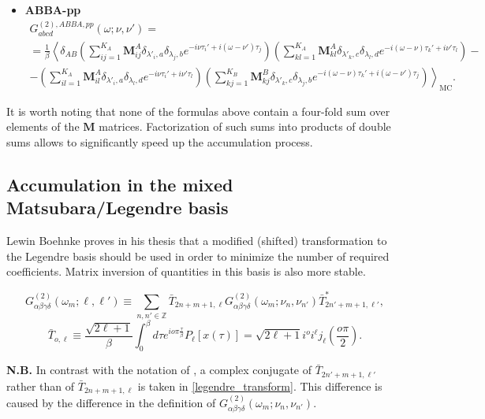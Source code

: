 \documentclass[a4paper,12pt]{article}
\renewcommand{\t}{\ensuremath{\tau}}
\newcommand{\w}{\ensuremath{\omega}}
\begin{document}
\begin{itemize}
	\item \textbf{ABBA-pp}
	\begin{multline}
	G^{(2),ABBA,pp}_{abcd}(\w;\nu,\nu') =\\= \frac{1}{\beta}\left\langle
		\delta_{AB}
		\left(\sum_{ij=1}^{K_A} \mathbf{M}^A_{ij}
			\delta_{\lambda'_i,a} \delta_{\lambda_j,b}
			e^{-i\nu\t_i'+i(\w-\nu')\t_j}
		\right)
		\left(\sum_{kl=1}^{K_A} \mathbf{M}^A_{kl}
			\delta_{\lambda'_k,c} \delta_{\lambda_l,d}
			e^{-i(\w-\nu)\t_k'+i\nu'\t_l}
		\right) -\right.\\\left.-
		\left(\sum_{il=1}^{K_A} \mathbf{M}^A_{il}
			\delta_{\lambda'_i,a} \delta_{\lambda_l,d}
			e^{-i\nu\t_i'+i\nu'\t_l}
		\right)
		\left(\sum_{kj=1}^{K_B} \mathbf{M}^B_{kj}
			\delta_{\lambda'_k,c} \delta_{\lambda_j,b}
			e^{-i(\w-\nu)\t_k'+i(\w-\nu')\t_j}
		\right)
		\right\rangle_\mathrm{MC}.
	\end{multline}
\end{itemize}

It is worth noting that none of the formulas above contain a four-fold sum
over elements of the $\mathbf{M}$ matrices. Factorization of such sums
into products of double sums allows to significantly speed up the accumulation
process.

\subsection{Accumulation in the mixed Matsubara/Legendre basis}

Lewin Boehnke proves in his thesis \cite{Boehnke15} that a modified (shifted)
transformation to the Legendre basis should be used in order to minimize the
number of required coefficients. Matrix inversion of quantities in this basis
is also more stable.

\begin{equation}\label{legendre_transform}
	G^{(2)}_{\alpha\beta\gamma\delta}(\w_m;\ell,\ell') \equiv
	\sum_{n,n'\in\mathbb{Z}}
	\bar T_{2n+m+1,\ell}
	G^{(2)}_{\alpha\beta\gamma\delta}(\w_m;\nu_n,\nu_{n'})
	\bar T^*_{2n'+m+1,\ell'},
\end{equation}
\begin{equation}
	\bar T_{o,\ell} \equiv \frac{\sqrt{2\ell+1}}{\beta}
	\int_0^\beta d\t e^{io\pi\frac{\t}{\beta}} P_\ell[x(\t)] =
	\sqrt{2\ell+1}i^o i^\ell j_\ell\left(\frac{o\pi}{2}\right).
\end{equation}

\textbf{N.B.} In contrast with the notation of \cite{Boehnke15},
a complex conjugate of $\bar T_{2n'+m+1,\ell'}$ rather than of
$\bar T_{2n+m+1,\ell}$ is taken in \ref{legendre_transform}.
This difference is caused by the difference in the definition of
$G^{(2)}_{\alpha\beta\gamma\delta}(\w_m;\nu_n,\nu_{n'})$.
\end{document}
